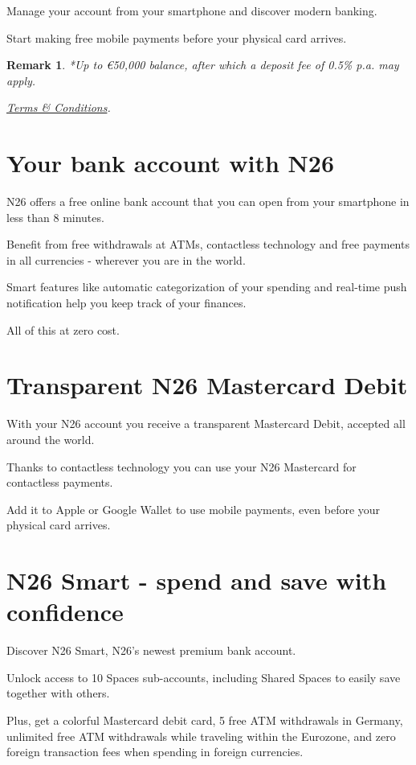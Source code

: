 \documentclass[onsided]{book}
\numberwithin{equation}{section}
\newtheorem{remark}{Remark}[section]
\begin{document}
Manage your account from your smartphone and discover modern banking.

Start making free mobile payments before your physical card arrives.

\begin{remark}
    *Up to €50,000 balance, after which a deposit fee of 0.5\% p.a. may apply.
    
    \href{https://n26.com/en-de/legal-documents}{Terms \& Conditions}.
\end{remark}

\section{Your bank account with N26}
N26 offers a free online bank account that you can open from your smartphone in less than 8 minutes.

Benefit from free withdrawals at ATMs, contactless technology and free payments in all currencies - wherever you are in the world.

Smart features like automatic categorization of your spending and real-time push notification help you keep track of your finances.

All of this at zero cost.

\section{Transparent N26 Mastercard Debit}
With your N26 account you receive a transparent Mastercard Debit, accepted all around the world.

Thanks to contactless technology you can use your N26 Mastercard for contactless payments.

Add it to Apple or Google Wallet to use mobile payments, even before your physical card arrives.

\section{N26 Smart - spend and save with confidence}
Discover N26 Smart, N26's newest premium bank account.

Unlock access to 10 Spaces sub-accounts, including Shared Spaces to easily save together with others.

Plus, get a colorful Mastercard debit card, 5 free ATM withdrawals in Germany, unlimited free ATM withdrawals while traveling within the Eurozone, and zero foreign transaction fees when spending in foreign currencies.
\end{document}
